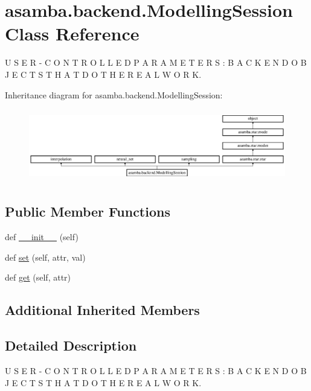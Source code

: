 \hypertarget{classasamba_1_1backend_1_1_modelling_session}{}\section{asamba.\+backend.\+Modelling\+Session Class Reference}
\label{classasamba_1_1backend_1_1_modelling_session}


U S E R -\/ C O N T R O L L E D P A R A M E T E R S \+: B A C K E N D O B J E C T S T H A T D O T H E R E A L W O R K.  


Inheritance diagram for asamba.\+backend.\+Modelling\+Session\+:\begin{figure}[H]
\begin{center}
\leavevmode
\includegraphics[height=3.211009cm]{classasamba_1_1backend_1_1_modelling_session}
\end{center}
\end{figure}
\subsection*{Public Member Functions}
\begin{DoxyCompactItemize}
\item 
def \hyperlink{classasamba_1_1backend_1_1_modelling_session_a4d7e25887ba7c8af5ae303b2dc63191d}{\+\_\+\+\_\+init\+\_\+\+\_\+} (self)
\item 
def \hyperlink{classasamba_1_1backend_1_1_modelling_session_a83549fd610225e6edea77914b0f65f30}{set} (self, attr, val)
\item 
def \hyperlink{classasamba_1_1backend_1_1_modelling_session_a32588cc6e0b3869d3d5ef688953599d2}{get} (self, attr)
\end{DoxyCompactItemize}
\subsection*{Additional Inherited Members}


\subsection{Detailed Description}
U S E R -\/ C O N T R O L L E D P A R A M E T E R S \+: B A C K E N D O B J E C T S T H A T D O T H E R E A L W O R K. 

